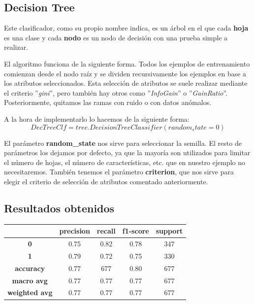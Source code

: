 \documentclass[11pt,a4paper]{article}
\begin{document}
\subsection{Decision Tree}
Este clasificador, como su propio nombre indica, es un árbol en el que cada \textbf{hoja} es una clase y cada \textbf{nodo} es
un nodo de decisión con una prueba simple a realizar.

El algoritmo funciona de la siguiente forma. Todos los ejemplos de entrenamiento comienzan desde el nodo raíz y se dividen
recursivamente los ejemplos en base a los atributos seleccionados. Esta selección de atributos se suele realizar mediante el
criterio ''\textit{gini}'', pero también hay otros como ''\textit{InfoGain}'' o ''\textit{GainRatio}''. Posteriormente,
quitamos las ramas con ruido o con datos anómalos.

A la hora de implementarlo lo hacemos de la siguiente forma:
$$DecTreeClf = tree.DecisionTreeClassifier(random_state=0)$$

El parámetro \textbf{random\_state} nos sirve para seleccionar la semilla. El resto de parámetros los dejamos por defecto, ya
que la mayoría son utilizados para limitar el número de hojas, el número de características, etc. que en nuestro ejemplo no
necesitaremos. También tenemos el parámetro \textbf{criterion}, que nos sirve para elegir el criterio de selección de atributos
comentado anteriormente.

\subsection*{Resultados obtenidos}
\begin{table}[H]
    \centering
    \begin{tabular}{c|cccc}
        \textbf{} & \textbf{precision} & \textbf{recall} & \textbf{f1-score} & \textbf{support} \\ \hline
        \textbf{0} & 0.75 & 0.82 & 0.78 & 347 \\
        \textbf{1} & 0.79 & 0.72 & 0.75 & 330 \\ \hline
        \textbf{accuracy} & 0.77 & 677 & 0.80 & 677 \\
        \textbf{macro avg} & 0.77 & 0.77 & 0.77 & 677 \\
        \textbf{weighted avg} & 0.77 & 0.77 & 0.77 & 677
    \end{tabular}
\end{table}
\end{document}

